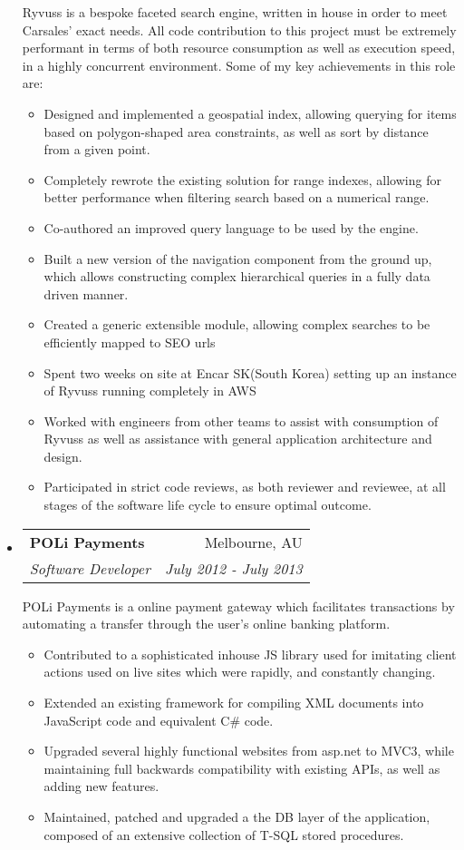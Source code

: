 \documentclass[letterpaper,11pt]{article}
\makeatletter
\newcommand{\resitem}[1]{\item #1 \vspace{-2pt}}
\newcommand{\ressubheading}[4]{
\begin{tabular*}{6.5in}{l@{\cftdotfill{\cftsecdotsep}\extracolsep{\fill}}r}
		\textbf{#1} & #2 \\
		\textit{#3} & \textit{#4} \\
\end{tabular*}\vspace{-6pt}}
\makeatother
\begin{document}
\begin{itemize}
	Ryvuss is a bespoke faceted search engine, written in house in order to meet Carsales' exact needs. All code contribution to this project must be extremely performant in terms of both resource consumption as well as execution speed, in a highly concurrent environment. Some of my key achievements in this role are:

	\begin{itemize}
		\resitem{Designed and implemented a geospatial index, allowing querying for items based on polygon-shaped area constraints, as well as sort by distance from a given point.}
		\resitem{Completely rewrote the existing solution for range indexes, allowing for better performance when filtering search based on a numerical range.}
		\resitem{Co-authored an improved query language to be used by the engine.}
		\resitem{Built a new version of the navigation component from the ground up, which allows constructing complex hierarchical queries in a fully data driven manner.}
		\resitem{Created a generic extensible module, allowing complex searches to be efficiently mapped to SEO urls}
		\resitem{Spent two weeks on site at Encar SK(South Korea) setting up an instance of Ryvuss running completely in AWS}
		\resitem{Worked with engineers from other teams to assist with consumption of Ryvuss as well as assistance with general application architecture and design.}
		\resitem{Participated in strict code reviews, as both reviewer and reviewee, at all stages of the software life cycle to ensure optimal outcome.}
	\end{itemize}

\item
	\ressubheading{POLi Payments}{Melbourne, AU}{Software Developer}{July 2012 - July 2013}
	
	POLi Payments is a online payment gateway which facilitates transactions by automating a transfer through the user's online banking platform. 
	\begin{itemize}
		\resitem{Contributed to a sophisticated inhouse JS library used for imitating client actions used on live sites which were rapidly, and constantly changing.}
		\resitem{Extended an existing framework for compiling XML documents into JavaScript code and equivalent C\# code.}
		\resitem{Upgraded several highly functional websites from asp.net to MVC3, while maintaining full backwards compatibility with existing APIs, as well as adding new features.} 
		\resitem{Maintained, patched and upgraded a the DB layer of the application, composed of an extensive collection of T-SQL stored procedures.}
	\end{itemize}
	

\end{itemize}
\end{document}
